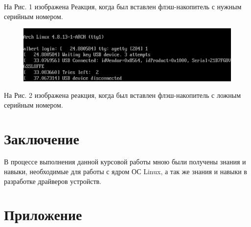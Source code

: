 \documentclass[a4paper]{article}
\begin{document}
На Рис. 1 изображена Реакция, когда был вставлен флэш-накопитель с нужным серийным номером.

\begin{figure}[h!]
\clearpage
\centering
\includegraphics[width=16cm]{bad.png} 
\caption{}
\end{figure} 

На Рис. 2 изображена реакция, когда был вставлен флэш-накопитель с ложным серийным номером.

\section{Заключение}

В процессе выполнения данной курсовой работы мною были получены знания и навыки, необходимые для работы с ядром ОС Linux, а так же знания и навыки в разработке драйверов устройств. 

\section{Приложение}
\end{document}

